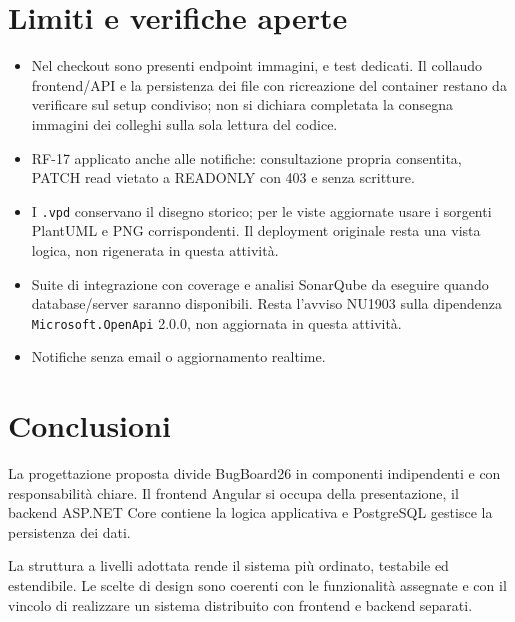 \documentclass[12pt,a4paper]{article}
\begin{document}
\section{Limiti e verifiche aperte}

\begin{itemize}
    \item Nel checkout sono presenti endpoint immagini,  e test dedicati. Il collaudo frontend/API e la persistenza dei file con ricreazione del container restano da verificare sul setup condiviso; non si dichiara completata la consegna immagini dei colleghi sulla sola lettura del codice.
    \item RF-17 applicato anche alle notifiche: consultazione propria consentita, PATCH read vietato a READONLY con 403 e senza scritture.
    \item I \texttt{.vpd} conservano il disegno storico; per le viste aggiornate usare i sorgenti PlantUML e PNG corrispondenti. Il deployment originale resta una vista logica, non rigenerata in questa attività.
    \item Suite di integrazione con coverage e analisi SonarQube da eseguire quando database/server saranno disponibili. Resta l'avviso NU1903 sulla dipendenza \texttt{Microsoft.OpenApi} 2.0.0, non aggiornata in questa attività.
    \item Notifiche senza email o aggiornamento realtime.
\end{itemize}

\section{Conclusioni}

La progettazione proposta divide BugBoard26 in componenti indipendenti e con responsabilità chiare. Il frontend Angular si occupa della presentazione, il backend ASP.NET Core contiene la logica applicativa e PostgreSQL gestisce la persistenza dei dati.

La struttura a livelli adottata rende il sistema più ordinato, testabile ed estendibile. Le scelte di design sono coerenti con le funzionalità assegnate e con il vincolo di realizzare un sistema distribuito con frontend e backend separati.
\end{document}
